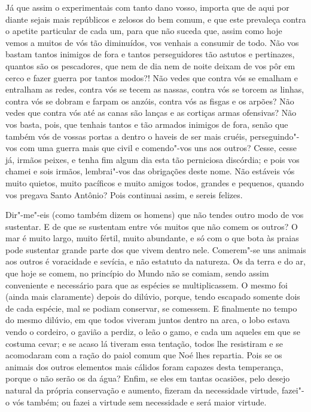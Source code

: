 Já que assim o experimentais com tanto dano vosso, importa que de aqui
por diante sejais mais repúblicos e zelosos do bem comum, e que este
prevaleça contra o apetite particular de cada um, para que não suceda
que, assim como hoje vemos a muitos de vós tão diminuídos, vos venhais a
consumir de todo. Não vos bastam tantos inimigos de fora e tantos
perseguidores tão astutos e pertinazes, quantos são os pescadores, que
nem de dia nem de noite deixam de vos pôr em cerco e fazer guerra por
tantos modos?! Não vedes que contra vós se emalham e entralham as redes,
contra vós se tecem as nassas, contra vós se torcem as linhas, contra
vós se dobram e farpam os anzóis, contra vós as fisgas e os arpões? Não
vedes que contra vós até as canas são lanças e as cortiças armas
ofensivas? Não vos basta, pois, que tenhais tantos e tão armados
inimigos de fora, senão que também vós de vossas portas a dentro o
haveis de ser mais cruéis, perseguindo"-vos com uma guerra mais que civil
e comendo"-vos uns aos outros? Cesse, cesse já, irmãos peixes, e tenha
fim algum dia esta tão perniciosa discórdia; e pois vos chamei e sois
irmãos, lembrai"-vos das obrigações deste nome. Não estáveis vós muito
quietos, muito pacíficos e muito amigos todos, grandes e pequenos,
quando vos pregava Santo Antônio? Pois continuai assim, e sereis
felizes.

Dir"-me"-eis (como também dizem os homens) que não tendes outro modo de
vos sustentar. E de que se sustentam entre vós muitos que não comem os
outros? O mar é muito largo, muito fértil, muito abundante, e só com o
que bota às praias pode sustentar grande parte dos que vivem dentro
nele. Comerem"-se uns animais aos outros é voracidade e sevícia, e não
estatuto da natureza. Os da terra e do ar, que hoje se comem, no
princípio do Mundo não se comiam, sendo assim conveniente e necessário
para que as espécies se multiplicassem. O mesmo foi (ainda mais
claramente) depois do dilúvio, porque, tendo escapado somente dois de
cada espécie, mal se podiam conservar, se comessem. E finalmente no
tempo do mesmo dilúvio, em que todos viveram juntos dentro na arca, o
lobo estava vendo o cordeiro, o gavião a perdiz, o leão o gamo, e cada
um aqueles em que se costuma cevar; e se acaso lá tiveram essa tentação,
todos lhe resistiram e se acomodaram com a ração do paiol comum que Noé
lhes repartia. Pois se os animais dos outros elementos mais cálidos
foram capazes desta temperança, porque o não serão os da água? Enfim, se
eles em tantas ocasiões, pelo desejo natural da própria conservação e
aumento, fizeram da necessidade virtude, fazei"-o vós também; ou fazei a
virtude sem necessidade e será maior virtude.

